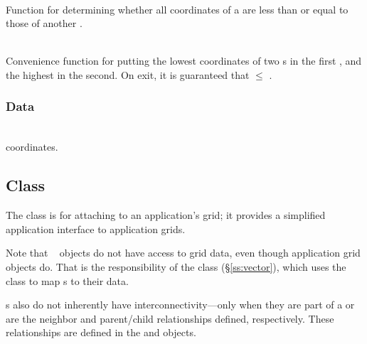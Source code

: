 \documentclass[11pt]{article}
\begin{document}
     \\
    Function for determining whether all coordinates of a 
    are less than or equal to those of another .

     \\
    Convenience function for putting the lowest coordinates of two
    s in the first , and the highest in the
    second.  On exit, it is guaranteed that  $\le$ .


\subsubsection{ Data}

      \\  coordinates.

\subsection{ Class} \label{ss:grid}

   \umlGrid

   The  class is for attaching to an application's grid;
   it provides a simplified application interface to application
   grids.

   Note that \amrSolve\  objects do not have access to
   grid data, even though application grid objects do.  That is the
   responsibility of the  class (\S\ref{ss:vector}), which
   uses the  class to map s to their data.

   s also do not inherently have interconnectivity---only
   when they are part of a  or  are
   the neighbor and parent/child relationships defined, respectively.
   These relationships are defined in the  and 
   objects.
\end{document}
